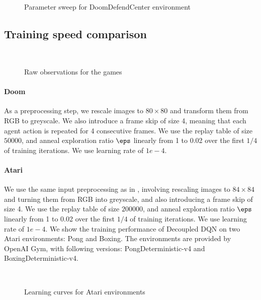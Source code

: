 \begin{figure*}[!t]
\\
\caption{Parameter sweep for DoomDefendCenter environment}
\label{fig:doom_sweep}
\end{figure*}

\subsection{Training speed comparison}

\begin{figure*}[!t]
\hfill
{}\\
\caption{Raw observations for the games}
\label{fig:game_frames}
\end{figure*}

\paragraph{Doom}
As a preprocessing step, we rescale images to $80 \times 80$ and transform them from RGB to greyscale.
We also introduce a frame skip of size 4, meaning that each agent action is repeated for 4 consecutive frames.
We use the replay table of size $50000$, and anneal exploration ratio $\eps$ linearly from 1 to 0.02
over the first $1/4$ of training iterations. We use learning rate of $1e-4$.

\paragraph{Atari}
We use the same input preprocessing as in \cite{mnih-dqn-2015}, involving rescaling images to $84
\times 84$ and turning them from RGB into greyscale, and also introducing a frame skip of size 4.
We use the replay table of size $200000$, and anneal exploration ratio $\eps$ linearly from 1 to 0.02
over the first $1/4$ of training iterations. We use learning rate of $1e-4$.
We show the training performance of Decoupled DQN on two Atari environments: Pong and Boxing.
The environments are provided by OpenAI Gym, with following versions: PongDeterministic-v4 and
BoxingDeterministic-v4.

\begin{figure*}[!t]
\\
\caption{Learning curves for Atari environments}
\label{fig:atari_curves}
\end{figure*}



